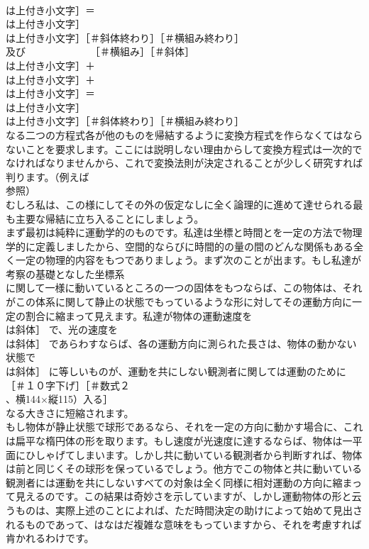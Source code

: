 \documentclass[8pt]{extreport}
\begin{document}
\begin{CJK}{UTF8}{min}
\\	は上付き小文字］＝
\\	は上付き小文字］
\\	は上付き小文字］［＃斜体終わり］［＃横組み終わり］
\\	及び　　　　　　　［＃横組み］［＃斜体］
\\	は上付き小文字］＋
\\	は上付き小文字］＋
\\	は上付き小文字］＝
\\	は上付き小文字］
\\	は上付き小文字］［＃斜体終わり］［＃横組み終わり］
\\	なる二つの方程式各が他のものを帰結するように変換方程式を作らなくてはならないことを要求します。ここには説明しない理由からして変換方程式は一次的でなければなりませんから、これで変換法則が決定されることが少しく研究すれば判ります。（例えば 
\\	参照）
\\	むしろ私は、この様にしてその外の仮定なしに全く論理的に進めて達せられる最も主要な帰結に立ち入ることにしましょう。
\\	まず最初は純粋に運動学的のものです。私達は坐標と時間とを一定の方法で物理学的に定義しましたから、空間的ならびに時間的の量の間のどんな関係もある全く一定の物理的内容をもつでありましょう。まず次のことが出ます。もし私達が考察の基礎となした坐標系 
\\	に関して一様に動いているところの一つの固体をもつならば、この物体は、それがこの体系に関して静止の状態でもっているような形に対してその運動方向に一定の割合に縮まって見えます。私達が物体の運動速度を 
\\	は斜体］ で、光の速度を 
\\	は斜体］ であらわすならば、各の運動方向に測られた長さは、物体の動かない状態で 
\\	は斜体］ に等しいものが、運動を共にしない観測者に関しては運動のために
\\	［＃１０字下げ］［＃数式２
\\	、横144×縦115）入る］
\\	なる大きさに短縮されます。
\\	もし物体が静止状態で球形であるなら、それを一定の方向に動かす場合に、これは扁平な楕円体の形を取ります。もし速度が光速度に達するならば、物体は一平面にひしゃげてしまいます。しかし共に動いている観測者から判断すれば、物体は前と同じくその球形を保っているでしょう。他方でこの物体と共に動いている観測者には運動を共にしないすべての対象は全く同様に相対運動の方向に縮まって見えるのです。この結果は奇妙さを示していますが、しかし運動物体の形と云うものは、実際上述のことによれば、ただ時間決定の助けによって始めて見出されるものであって、はなはだ複雑な意味をもっていますから、それを考慮すれば肯かれるわけです。

\end{CJK}
\end{document}
